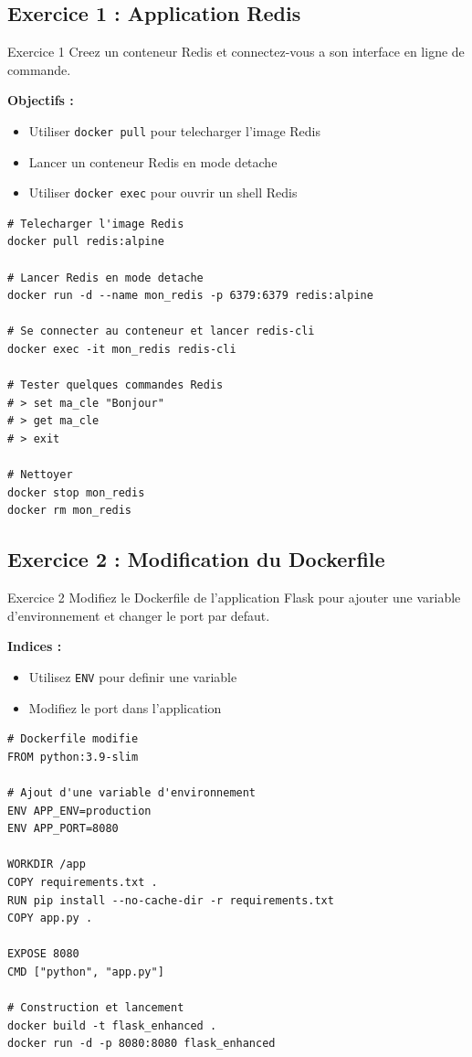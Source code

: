\documentclass[a4paper,12pt]{article}
\begin{document}
\subsection{Exercice 1 : Application Redis}
\begin{importantbox}{Exercice 1}
Creez un conteneur Redis et connectez-vous a son interface en ligne de commande.
\end{importantbox}
\textbf{Objectifs :}
\begin{itemize}
    \item Utiliser \texttt{docker pull} pour telecharger l'image Redis
    \item Lancer un conteneur Redis en mode detache
    \item Utiliser \texttt{docker exec} pour ouvrir un shell Redis
\end{itemize}
\begin{lstlisting}[caption=Correction]
# Telecharger l'image Redis
docker pull redis:alpine

# Lancer Redis en mode detache
docker run -d --name mon_redis -p 6379:6379 redis:alpine

# Se connecter au conteneur et lancer redis-cli
docker exec -it mon_redis redis-cli

# Tester quelques commandes Redis
# > set ma_cle "Bonjour"
# > get ma_cle
# > exit

# Nettoyer
docker stop mon_redis
docker rm mon_redis
\end{lstlisting}

\subsection{Exercice 2 : Modification du Dockerfile}
\begin{importantbox}{Exercice 2}
Modifiez le Dockerfile de l'application Flask pour ajouter une variable d'environnement et changer le port par defaut.
\end{importantbox}
\textbf{Indices :}
\begin{itemize}
    \item Utilisez \texttt{ENV} pour definir une variable
    \item Modifiez le port dans l'application
\end{itemize}
\begin{lstlisting}[caption=Correction]
# Dockerfile modifie
FROM python:3.9-slim

# Ajout d'une variable d'environnement
ENV APP_ENV=production
ENV APP_PORT=8080

WORKDIR /app
COPY requirements.txt .
RUN pip install --no-cache-dir -r requirements.txt
COPY app.py .

EXPOSE 8080
CMD ["python", "app.py"]

# Construction et lancement
docker build -t flask_enhanced .
docker run -d -p 8080:8080 flask_enhanced
\end{lstlisting}
\end{document}
